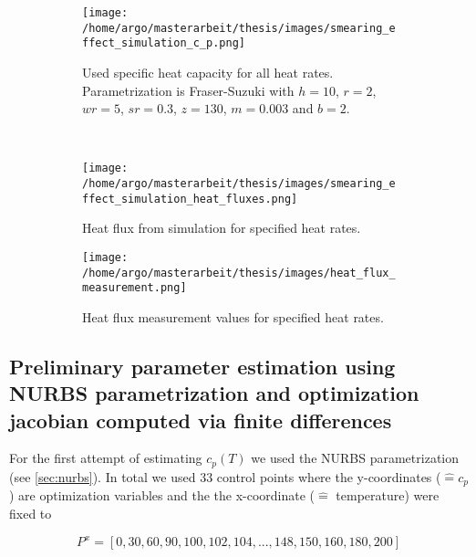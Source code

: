 \documentclass{scrartcl}[12pt, halfparskip]
\numberwithin{equation}{section}
\numberwithin{figure}{section}
\numberwithin{table}{section}
\begin{document}
\begin{figure}[H]
	\centering
	\begin{subfigure}{0.9\textwidth}
		\centering
		\texttt{[image: /home/argo/masterarbeit/thesis/images/smearing\_effect\_simulation\_c\_p.png]}
		\caption{Used specific heat capacity for all heat rates. Parametrization is Fraser-Suzuki with $h=10$, $r=2$, $wr=5$, $sr=0.3$, $z=130$, $m=0.003$ and $b=2$.}
		\label{fig:smearing_effect_c_p}
	\end{subfigure} \\
	\begin{subfigure}{0.49\textwidth}
		\texttt{[image: /home/argo/masterarbeit/thesis/images/smearing\_effect\_simulation\_heat\_fluxes.png]}
		\caption{Heat flux from simulation for specified heat rates.}
		\label{fig:smearing_effect_simulation_heat_flux}
	\end{subfigure}
	\begin{subfigure}{0.49\textwidth}
		\texttt{[image: /home/argo/masterarbeit/thesis/images/heat\_flux\_measurement.png]}
		\caption{Heat flux measurement values for specified heat rates.}
		\label{fig:smearing_effect_measurement_heat_flux}
	\end{subfigure}
	\caption{}
\end{figure}



\subsection{Preliminary parameter estimation using NURBS parametrization and optimization jacobian computed via finite differences}
\label{sec:param_estim_NURBS}

For the first attempt of estimating $c_p(T)$  we used the NURBS parametrization (see \cref{sec:nurbs}). In total we used 33 control points where the y-coordinates ($\hat{=} c_p$) are optimization variables and the the x-coordinate ($\hat{=}$ temperature) were fixed to 

\begin{equation}
	P^x = [0, 30, 60, 90, 100, 102, 104, ..., 148, 150, 160, 180, 200]
\end{equation}
\end{document}
